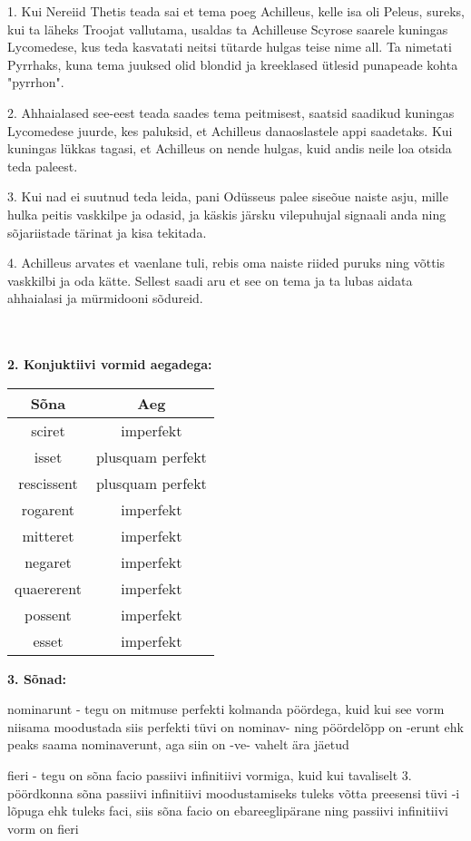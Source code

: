 \documentclass[12pt]{article}
\begin{document}
\quad\vline\quad%
\begin{minipage}[t]{.5\textwidth}
\raggedright
1. Kui Nereiid Thetis teada sai et tema poeg Achilleus, kelle isa oli Peleus, sureks, kui ta läheks Troojat vallutama, usaldas ta Achilleuse Scyrose saarele kuningas Lycomedese, kus teda kasvatati neitsi tütarde hulgas teise nime all. Ta nimetati Pyrrhaks, kuna tema juuksed olid blondid ja kreeklased ütlesid punapeade kohta "pyrrhon".\newline

2. Ahhaialased see-eest teada saades tema peitmisest, saatsid saadikud kuningas Lycomedese juurde, kes paluksid, et Achilleus danaoslastele appi saadetaks. Kui kuningas lükkas tagasi, et Achilleus on nende hulgas, kuid andis neile loa otsida teda paleest.\newline

3. Kui nad ei suutnud teda leida, pani Odüsseus palee siseõue naiste asju, mille hulka peitis vaskkilpe ja odasid, ja käskis järsku vilepuhujal signaali anda ning sõjariistade tärinat ja kisa tekitada.\newline

4. Achilleus arvates et vaenlane tuli, rebis oma naiste riided puruks ning võttis vaskkilbi ja oda kätte. Sellest saadi aru et see on tema ja ta lubas aidata ahhaialasi ja mürmidooni sõdureid.
\end{minipage}\\\\

\textbf{2. Konjuktiivi vormid aegadega:}\\
\begin{tabular}{c|c}
\textbf{Sõna}&\textbf{Aeg}\\
\hline
sciret&imperfekt\\
isset&plusquam perfekt\\
\hline
rescissent&plusquam perfekt\\
rogarent&imperfekt\\
mitteret&imperfekt\\
negaret&imperfekt\\
quaererent&imperfekt\\
\hline
possent&imperfekt\\
esset&imperfekt\\
\end{tabular}

\newpage


\textbf{3. Sõnad:}
\itemize
\item nominarunt - tegu on mitmuse perfekti kolmanda pöördega, kuid kui see vorm niisama moodustada siis perfekti tüvi on nominav- ning pöördelõpp on -erunt ehk peaks saama nominaverunt, aga siin on -ve- vahelt ära jäetud
\item fieri - tegu on sõna facio passiivi infinitiivi vormiga, kuid kui tavaliselt 3. pöördkonna sõna passiivi infinitiivi moodustamiseks tuleks võtta preesensi tüvi -i lõpuga ehk tuleks faci, siis sõna facio on ebareeglipärane ning passiivi infinitiivi vorm on fieri
\end{document}
